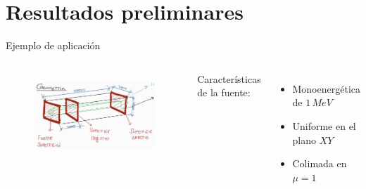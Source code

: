 \documentclass[aspectratio=169,english]{beamer}
\begin{document}
\section{Resultados preliminares}
\begin{frame}{Ejemplo de aplicación}
    

    \begin{columns}
        \begin{figure}
            \centering
            \includegraphics[width=\linewidth]{imagens/croquis1.jpeg}
            \label{fig:croquis1}
        \end{figure}
        
        Características de la fuente:
        \begin{itemize}
            \item Monoenergética de $1 \, MeV$
            \item Uniforme en el plano $XY$
            \item Colimada en $\mu = 1$ 
        \end{itemize}
    \end{columns}

\end{frame}
\end{document}
